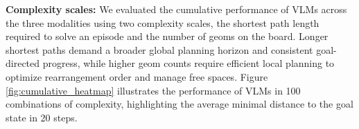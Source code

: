 \textbf{Complexity scales:} We evaluated the cumulative performance of VLMs across the three modalities using two complexity scales, the shortest path length required to solve an episode and the number of geoms on the board. Longer shortest paths demand a broader global planning horizon and consistent goal-directed progress, while higher geom counts require efficient local planning to optimize rearrangement order and manage free spaces. Figure \ref{fig:cumulative_heatmap} illustrates the performance of VLMs in 100 combinations of complexity, highlighting the average minimal distance to the goal state in 20 steps.